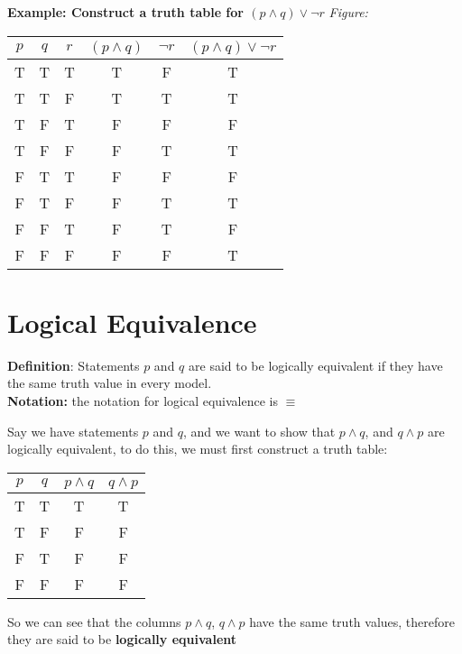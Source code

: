 \documentclass{report}
\begin{document}
    \pagebreak \bigbreak \noindent 
    \begin{mdframed}
      \textbf{Example: Construct a truth table for $(p\land q) \lor  \neg r$}
      \bigbreak \noindent 
      \textit{Figure:}
      \bigbreak \noindent 
      \begin{center}
          \begin{tabular}{|c|c|c|c|c|c|}
            \hline
            \(p\) & \(q\) & \(r\) & \((p \land q)\) & \(\neg r\) & \((p \land q) \lor \neg r\) \\
            \hline
            T & T & T & T & F & T \\
            \hline 
            T & T & F & T & T & T \\
            \hline
            T & F &T & F &F&F \\
            \hline
            T&F&F&F&T&T \\
            \hline
            F&T&T&F&F&F \\
            \hline 
            F&T&F&F&T&T \\
            \hline
            F&F&T&F&T&F \\
            \hline
            F&F&F&F&F&T \\
            \hline
        \end{tabular}
      \end{center}
    \end{mdframed}

    \bigbreak \noindent \bigbreak \noindent 
    \section{Logical Equivalence}
    \bigbreak \noindent 
    \begin{mdframed}
        \textbf{Definition}:
        Statements $p$ and $q$ are said to be logically equivalent if they have the same truth value in every model. \\
        \textbf{Notation:} the notation for logical equivalence is $\equiv $
    \end{mdframed}
    \bigbreak \noindent 
    Say we have statements $p$ and $q$, and we want to show that $p \land q$, and $q \land p$ are logically equivalent, to do this, we must first construct a  truth table:
    \begin{center}
        \begin{tabular}{|c|c|c|c|}
        \hline
        $p$ & $q$ & $p\land q$ & $q \land p $\\
        \hline
        T&T&T&T  \\
        \hline
        T&F&F&F \\
        \hline
        F&T&F&F \\
        \hline   
        F&F&F&F \\
        \hline 
        \end{tabular}
    \end{center}
    \bigbreak \noindent 
    So we can see that the columns $p\land q$, $q\land p$ have the same truth values, therefore they are said to be \textbf{logically equivalent}
\end{document}
